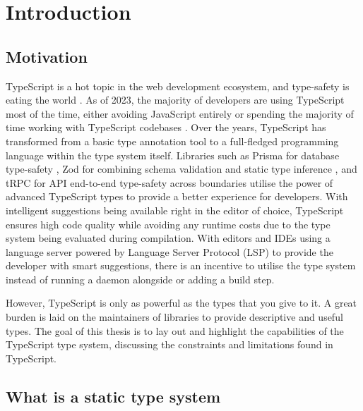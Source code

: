 \chapter{Introduction}

\section{Motivation}

TypeScript is a hot topic in the web development ecosystem, and type-safety is eating the world \cite{jsworldconferenceFredSchottTypesafety2023}. As of 2023, the majority of developers are using TypeScript most of the time, either avoiding JavaScript entirely or spending the majority of time working with TypeScript codebases \cite{StateJS2022}. Over the years, TypeScript has transformed from a basic type annotation tool to a full-fledged programming language within the type system itself. Libraries such as Prisma for database type-safety \cite{PrismaPrismaNextgeneration}, Zod for combining schema validation and static type inference \cite{mcdonnellZod2023}, and tRPC for API end-to-end type-safety across boundaries \cite{TRPC2023} utilise the power of advanced TypeScript types to provide a better experience for developers. With intelligent suggestions being available right in the editor of choice, TypeScript ensures high code quality while avoiding any runtime costs due to the type system being evaluated during compilation. With editors and IDEs using a language server powered by Language Server Protocol (LSP) to provide the developer with smart suggestions, there is an incentive to utilise the type system instead of running a daemon alongside or adding a build step.

However, TypeScript is only as powerful as the types that you give to it. A great burden is laid on the maintainers of libraries to provide descriptive and useful types. The goal of this thesis is to lay out and highlight the capabilities of the TypeScript type system, discussing the constraints and limitations found in TypeScript. 

\section{What is a static type system}

